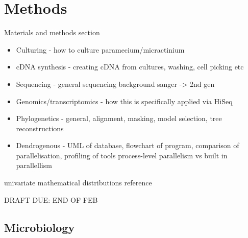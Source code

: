 \graphicspath{{chapters/2.Methods/figures}}

\chapter{Methods}

Materials and methods section

\begin{itemize}
    \item Culturing - how to culture paramecium/micractinium
    \item cDNA synthesis - creating cDNA from cultures, washing, cell picking etc
    \item Sequencing - general sequencing background sanger -> 2nd gen
    \item Genomics/transcriptomics - how this is specifically applied via HiSeq
    \item Phylogenetics - general, alignment, masking, model selection, tree reconstructions 
    \item Dendrogenous - UML of database, flowchart of program, comparison of parallelisation, profiling of tools process-level parallelism vs built in parallellism
\end{itemize}

univariate mathematical distributions reference\citep{Leemis2008}

%
%
%
%
%
%

DRAFT DUE: END OF FEB


\section{Microbiology}

